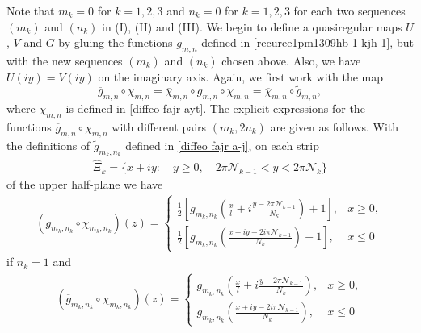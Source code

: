 \documentclass[12pt]{amsart}
\numberwithin{equation}{section}
\begin{document}
Note that $m_k=0$ for $k=1,2,3$ and $n_k=0$ for $k=1,2,3$ for each two sequences $(m_k)$ and $(n_k)$ in (I), (II) and (III). We begin to define a quasiregular maps $U$, $V$ and $G$ by gluing the functions $\overline{g}_{m,n}$ defined in \eqref{recuree1pm1309hb-1-kjh-1}, but with the new sequences $(m_k)$ and $(n_k)$ chosen above. Also, we have $U(iy)=V(iy)$ on the imaginary axis. Again, we first work with the map
\begin{equation*}
\overline{g}_{m,n}\circ\chi_{m,n}=\overline{\chi}_{m,n}\circ g_{m,n}\circ\chi_{m,n}=\overline{\chi}_{m,n}\circ \tilde{g}_{m,n},
\end{equation*}
where $\chi_{m,n}$ is defined in \eqref{diffeo  fajr  ayt}. The explicit expressions for the functions $\overline{g}_{m,n}\circ\chi_{m,n}$ with different pairs $(m_k,2n_k)$ are given as follows. With the definitions of $\tilde{g}_{m_k,n_k}$ defined in \eqref{diffeo  fajr  a-j}, on each strip
\begin{equation*}%
\begin{split}
\hat{\Xi}_k=\{x+iy: \quad y\geq0, \quad 2\pi\mathcal{N}_{k-1}<y< 2\pi\mathcal{N}_k\}
\end{split}
\end{equation*}
of the upper half-plane we have
\begin{equation}\label{recuree1-main eq1--nmb4}
\begin{split}
(\overline{g}_{m_k,n_k}\circ\chi_{m_k,n_k})(z)=\left\{
\begin{array}{ll}
\frac{1}{2}\left[g_{m_k,n_k}\left(\frac{x}{l}+i\frac{y-2\pi\mathcal{N}_{k-1}}{N_k}\right)+1\right], & x\geq 0, \\
\frac{1}{2}\left[g_{m_k,n_k}\left(\frac{x+iy-2i\pi\mathcal{N}_{k-1}}{N_k}\right)+1\right],
& x\leq 0
\end{array}
\right.
\end{split}
\end{equation}
if $n_k=1$ and
\begin{equation}\label{recuree1-main eq2--nmb5}
\begin{split}
(\overline{g}_{m_k,n_k}\circ\chi_{m_k,n_k})(z)=\left\{
\begin{array}{ll}
g_{m_k,n_k}\left(\frac{x}{l}+i\frac{y-2\pi\mathcal{N}_{k-1}}{N_k}\right), & x\geq 0, \\
g_{m_k,n_k}\left(\frac{x+iy-2i\pi\mathcal{N}_{k-1}}{N_k}\right),          & x\leq 0
\end{array}
\right.
\end{split}
\end{equation}
\end{document}
